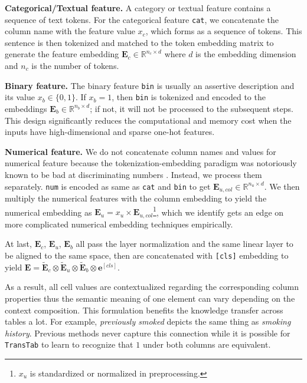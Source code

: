 \textbf{Categorical/Textual feature.} A category or textual feature contains a sequence of text tokens. For the categorical feature \texttt{cat}, we concatenate the column name with the feature value $x_c$, which forms as a sequence of tokens. This sentence is then tokenized and matched to the token embedding matrix to generate the feature embedding ${\mathbf{E}}_c \in \mathbb{R}^{n_c \times d}$ where $d$ is the embedding dimension and $n_c$ is the number of tokens.

\textbf{Binary feature.} The binary feature \texttt{bin} is usually an assertive description and its value $x_b \in \{0,1\}$. If $x_b=1$, then \texttt{bin} is tokenized and encoded to the embeddings ${\mathbf{E}}_{b}\in\mathbb{R}^{n_b\times d}$; if not, it will not be processed to the subsequent steps. This design significantly reduces the computational and memory cost when the inputs have high-dimensional and sparse one-hot features.

\textbf{Numerical feature.} We do not concatenate column names and values for numerical feature because the tokenization-embedding paradigm was notoriously known to be bad at discriminating numbers \cite{lin2020birds}. Instead, we process them separately. \texttt{num} is encoded as same as \texttt{cat} and \texttt{bin} to get ${\mathbf{E}}_{u,col} \in \mathbb{R}^{n_u\times d}$. We then multiply the numerical features with the column embedding to yield the numerical embedding as ${\mathbf{E}}_{u} = x_u \times {\mathbf{E}}_{u,col}$\footnote{$x_u$ is standardized or normalized in preprocessing.}, which we identify gets an edge on more complicated numerical embedding techniques empirically.

At last, ${\mathbf{E}}_c$, ${\mathbf{E}}_u$, ${\mathbf{E}}_b$ all pass the layer normalization \cite{ba2016layer} and the same linear layer to be aligned to the same space, then are concatenated with \texttt{[cls]} embedding to yield ${\mathbf{E}} = \tilde{{\mathbf{E}}}_c \otimes \tilde{{\mathbf{E}}}_u \otimes \tilde{{\mathbf{E}}}_b \otimes \mathbf{e}^{[cls]}$. 

As a result, all cell values are contextualized regarding the corresponding column properties thus the semantic meaning of one element can vary depending on the context composition. This formulation benefits the knowledge transfer across tables a lot. For example, \textit{previously smoked} depicts the same thing as \textit{smoking history}. Previous methods never capture this connection while it is possible for \texttt{TransTab} to learn to recognize that $1$ under both columns are equivalent.

